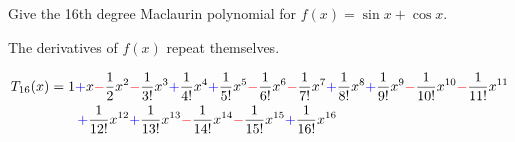 %
%



\subsection*{\Procedural}


\begin{Mquestion}
Give the 16th degree Maclaurin polynomial for $f(x)=\sin x+ \cos x$.
\end{Mquestion}
\begin{hint}
The derivatives of $f(x)$ repeat themselves.
\end{hint}
\begin{answer}
\begin{align*}
T_{16}(x)&=1\textcolor{blue}{+}x
\textcolor{red}{-}\frac{1}{2}x^2
\textcolor{red}{-}\frac{1}{3!}x^3
\textcolor{blue}{+}\frac{1}{4!}x^4
\textcolor{blue}{+}\frac{1}{5!}x^5
\textcolor{red}{-}\frac{1}{6!}x^6
\textcolor{red}{-}\frac{1}{7!}x^7
\textcolor{blue}{+}\frac{1}{8!}x^8
\textcolor{blue}{+}\frac{1}{9!}x^9
\textcolor{red}{-}\frac{1}{10!}x^{10}
\textcolor{red}{-}\frac{1}{11!}x^{11}\\
&\qquad\textcolor{blue}{+}\frac{1}{12!}x^{12}
\textcolor{blue}{+}\frac{1}{13!}x^{13}
\textcolor{red}{-}\frac{1}{14!}x^{14}
\textcolor{red}{-}\frac{1}{15!}x^{15}
\textcolor{blue}{+}\frac{1}{16!}x^{16}
\end{align*}
\end{answer}
